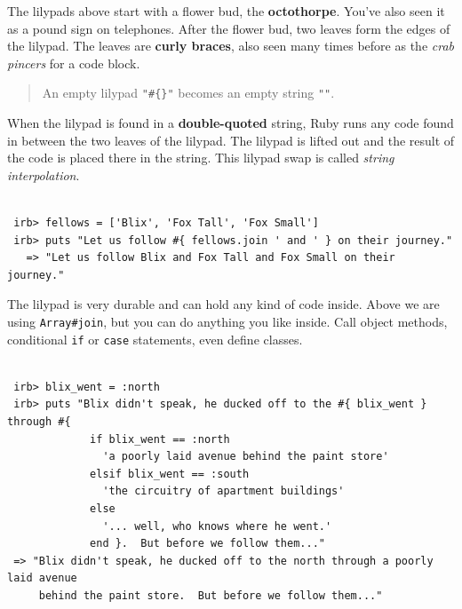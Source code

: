 \documentclass[10pt,twoside]{report}
\begin{document}
The lilypads above start with a flower bud, the {\bf octothorpe}.
You've also seen it as a pound sign on telephones.  After the flower
bud, two leaves form the edges of the lilypad.  The leaves are {\bf
  curly braces}, also seen many times before as the {\em crab pincers}
for a code block.

\begin{quote}
An empty lilypad \lstinline[breaklines=true]|"#{}"| becomes an empty
string \lstinline[breaklines=true]|""|.\end{quote}


When the lilypad is found in a {\bf double-quoted} string, Ruby runs
any code found in between the two leaves of the lilypad.  The lilypad
is lifted out and the result of the code is placed there in the
string.  This lilypad swap is called {\em string interpolation}.


\begin{lstlisting}

 irb> fellows = ['Blix', 'Fox Tall', 'Fox Small']
 irb> puts "Let us follow #{ fellows.join ' and ' } on their journey."
   => "Let us follow Blix and Fox Tall and Fox Small on their journey."

\end{lstlisting}


The lilypad is very durable and can hold any kind of code inside.
Above we are using \lstinline[breaklines=true]|Array#join|, but you
can do anything you like inside.  Call object methods, conditional
\lstinline[breaklines=true]|if| or \lstinline[breaklines=true]|case|
statements, even define classes.


\begin{lstlisting}

 irb> blix_went = :north
 irb> puts "Blix didn't speak, he ducked off to the #{ blix_went } through #{
             if blix_went == :north
               'a poorly laid avenue behind the paint store'
             elsif blix_went == :south
               'the circuitry of apartment buildings'
             else
               '... well, who knows where he went.'
             end }.  But before we follow them..."
 => "Blix didn't speak, he ducked off to the north through a poorly laid avenue
     behind the paint store.  But before we follow them..."

\end{lstlisting}
\end{document}

